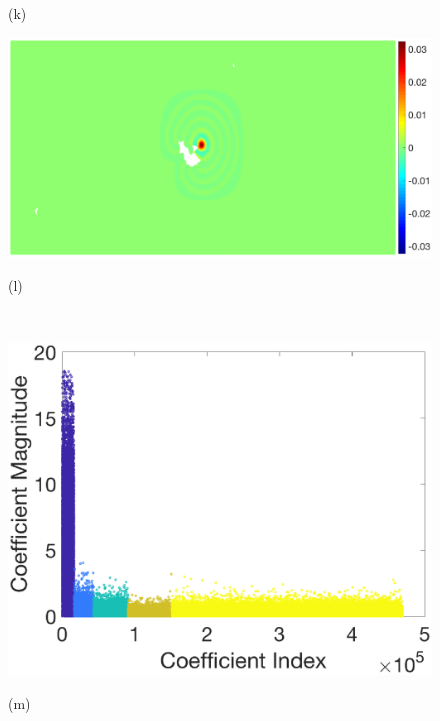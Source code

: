 \documentclass[journal, 10pt]{IEEEtran}
\begin{document}
\begin{figure}[tb]
\begin{minipage}[m]{0.24\linewidth}
\centerline{\small{(k)}} 
\end{minipage} 
\begin{minipage}[m]{0.24\linewidth}
\centerline{\includegraphics[width=1\linewidth]{fig_temp_scaling_zoom}}
\centerline{\small{(l)}}
\end{minipage} \medskip \\
\begin{minipage}[m]{0.24\linewidth}
\centerline{\includegraphics[width=1\linewidth]{fig_temp_analysis_coeffs}}
\centerline{\small{(m)}}
\end{minipage}
\begin{minipage}[m]{0.24\linewidth}

\end{minipage}
\end{figure}
\end{document}

